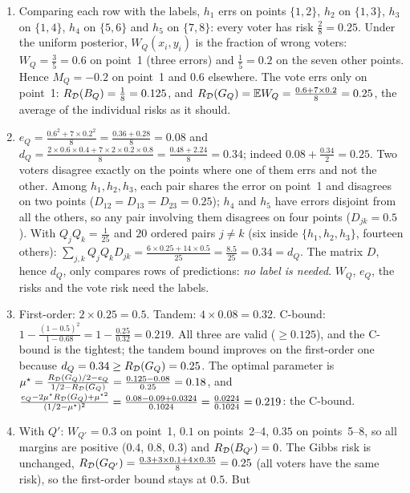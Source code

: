 \documentclass[11pt]{article}
\begin{document}
\begin{solution}
\begin{enumerate}
\item Comparing each row with the labels, $h_1$ errs on points $\{1,2\}$, $h_2$ on $\{1,3\}$, $h_3$ on $\{1,4\}$, $h_4$ on $\{5,6\}$
      and $h_5$ on $\{7,8\}$: every voter has risk $\frac28=0.25$. Under the uniform posterior, $W_Q(x_i,y_i)$ is the
      fraction of wrong voters: $W_Q=\frac35=0.6$ on point~1 (three errors) and $\frac15=0.2$ on the seven other points. Hence
      $M_Q=-0.2$ on point~1 and $0.6$ elsewhere. The vote errs only on point~1: $R_{\mathcal{D}}(B_{Q})=\frac18=0.125$, and
      $R_{\mathcal{D}}(G_{Q})=\mathbb{E} W_Q=\frac{0.6+7\times0.2}8=0.25$, the average of the individual risks as it should.
\item $e_Q=\frac{0.6^2+7\times0.2^2}8=\frac{0.36+0.28}8=0.08$ and $d_Q=\frac{2\times0.6\times0.4+7\times2\times0.2\times0.8}8=\frac{0.48+2.24}8=0.34$;
      indeed $0.08+\frac{0.34}2=0.25$. Two voters disagree exactly on the points where one of them errs and not the
      other. Among $h_1,h_2,h_3$, each pair shares the error on point~1 and disagrees on two points ($D_{12}=D_{13}=D_{23}=0.25$);
      $h_4$ and $h_5$ have errors disjoint from all the others, so any pair involving them disagrees on four points
      ($D_{jk}=0.5$). With $Q_jQ_k=\frac1{25}$ and $20$ ordered pairs $j\neq k$ (six inside $\{h_1,h_2,h_3\}$, fourteen others):
      $\sum_{j,k}Q_jQ_kD_{jk}=\frac{6\times0.25+14\times0.5}{25}=\frac{8.5}{25}=0.34=d_Q$. The matrix $D$, hence $d_Q$, only compares
      rows of predictions: \emph{no label is needed}. $W_Q$, $e_Q$, the risks and the vote risk need the labels.
\item First-order: $2\times0.25=0.5$. Tandem: $4\times0.08=0.32$. C-bound: $1-\frac{(1-0.5)^2}{1-0.68}=1-\frac{0.25}{0.32}=0.219$. All three
      are valid ($\geq0.125$), and the C-bound is the tightest; the tandem bound improves on the first-order one because
      $d_Q=0.34\geq R_{\mathcal{D}}(G_{Q})=0.25$. The optimal parameter is $\mu^\star=\frac{R_{\mathcal{D}}(G_{Q})/2-e_Q}{1/2-R_{\mathcal{D}}(G_{Q})}=\frac{0.125-0.08}{0.25}=0.18$, and
      $\frac{e_Q-2\mu^\star R_{\mathcal{D}}(G_{Q})+\mu^{\star2}}{(1/2-\mu^\star)^2}=\frac{0.08-0.09+0.0324}{0.1024}=\frac{0.0224}{0.1024}=0.219$: the C-bound.
\item With $Q'$: $W_{Q'}=0.3$ on point~1, $0.1$ on points~2--4, $0.35$ on points~5--8, so all margins are positive
      ($0.4$, $0.8$, $0.3$) and $R_{\mathcal{D}}(B_{Q'})=0$. The Gibbs risk is unchanged, $R_{\mathcal{D}}(G_{Q'})=\frac{0.3+3\times0.1+4\times0.35}8=0.25$
      (all voters have the same risk), so the first-order bound stays at $0.5$. But

\end{enumerate}
\end{solution}
\end{document}
